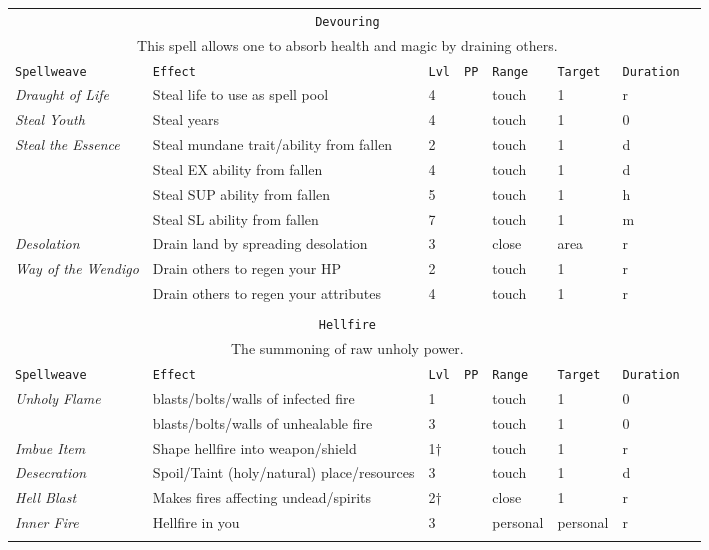 \documentclass[10pt,a4paper]{article}
\begin{document}
\begin{table}[htbp!]
\begin{tabular}{llllllll}
    \multicolumn{7}{c}{\texttt{Devouring}}\\
    \multicolumn{7}{c}{This spell allows one to absorb health and magic by draining others.}\\
    \hline
    \texttt{Spellweave} & \texttt{Effect} & \texttt{Lvl} & \texttt{PP} & \texttt{Range} & \texttt{Target} & \texttt{Duration} \\
    \hline
    \multirow{1}{*}{\textit{Draught of Life}} & Steal life to use as spell pool & 4 && touch & 1 & r \\
    \hline
    \multirow{1}{*}{\textit{Steal Youth}} & Steal years & 4 && touch & 1 & 0 \\
    \hline
    \multirow{1}{*}{\textit{Steal the Essence}} & Steal mundane trait/ability from fallen & 2 && touch & 1 & d \\
    											   & Steal EX ability from fallen & 4 && touch & 1 & d \\
											   & Steal SUP ability from fallen & 5 && touch & 1 & h \\
											   & Steal SL ability from fallen & 7 && touch & 1 & m \\
    \hline
    \multirow{1}{*}{\textit{Desolation}} & Drain land by spreading desolation & 3 && close & area & r \\
    \hline
	\multirow{1}{*}{\textit{Way of the Wendigo}} & Drain others to regen your HP & 2 && touch & 1 & r \\
										        & Drain others to regen your attributes & 4 && touch & 1 & r \\
        &&&&&&\\

    
     \multicolumn{7}{c}{\texttt{Hellfire}}\\
     \multicolumn{7}{c}{The summoning of raw unholy power.}\\
    \hline
    \texttt{Spellweave} & \texttt{Effect} & \texttt{Lvl} & \texttt{PP} & \texttt{Range} & \texttt{Target} & \texttt{Duration} \\
    \hline
    \multirow{1}{*}{\textit{Unholy Flame}} & blasts/bolts/walls of infected  fire & 1 && touch & 1 & 0 \\
								  & blasts/bolts/walls of unhealable fire  & 3 && touch & 1 & 0 \\
    \hline
    \multirow{1}{*}{\textit{Imbue Item}} & Shape hellfire into weapon/shield & 1$\dagger$ && touch & 1 & r \\
    \hline
    \multirow{1}{*}{\textit{Desecration}} & Spoil/Taint (holy/natural) place/resources & 3 && touch & 1 & d \\
    \hline
    \multirow{1}{*}{\textit{Hell Blast}} & Makes fires affecting undead/spirits & 2$\dagger$ && close & 1 & r \\
    \hline
    \multirow{1}{*}{\textit{Inner Fire}} & Hellfire in you & 3 && personal & personal & r \\
       &&&&&&\\ 
     \end{tabular}
\end{table}  
\end{document}
